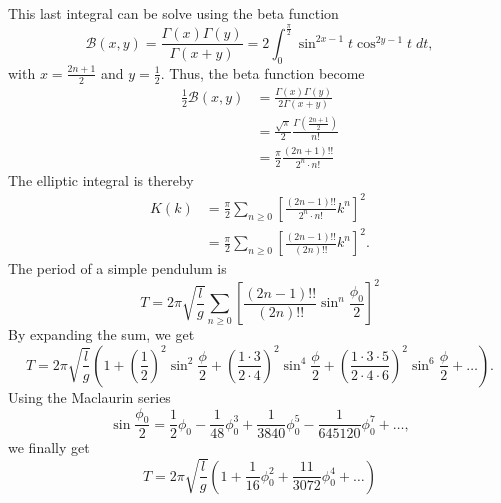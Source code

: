 \begin{problem}
{This last integral can be solve using the beta function
\begin{equation*}
    \mathcal{B}(x,y) = \frac{\Gamma(x)\Gamma(y)}{\Gamma(x+y)} = 2\int_0^{\frac{\pi}{2}} \sin^{2x-1}{t}\cos^{2y-1}{t}\;dt,
\end{equation*}
with $x=\frac{2n+1}{2}$ and $y=\frac{1}{2}$. Thus, the beta function become
\begin{align*}
    \frac{1}{2}\mathcal{B}(x,y) &= \frac{\Gamma(x)\Gamma(y)}{2\Gamma(x+y)} \\
    &= \frac{\sqrt{\pi}}{2}\frac{\Gamma(\frac{2n+1}{2})}{n!} \\
    &= \frac{\pi}{2}\frac{(2n+1)!!}{2^n \cdot n!}
\end{align*}
The elliptic integral is thereby
\begin{align*}
    K(k) &= \frac{\pi}{2} \sum_{n\geq0}\left[\frac{(2n-1)!!}{2^n \cdot n!}k^{n}\right]^2 \\
    &= \frac{\pi}{2} \sum_{n\geq0}\left[\frac{(2n-1)!!}{(2n)!!}k^{n}\right]^2.
\end{align*}
The period of a simple pendulum is
\begin{equation*}
    T = 2\pi\sqrt{\frac{l}{g}}\sum_{n\geq0}\left[\frac{(2n-1)!!}{(2n)!!}\sin^n{\frac{\phi_0}{2}}\right]^2
\end{equation*}
By expanding the sum, we get
\begin{equation*}
    T = 2\pi\sqrt{\frac{l}{g}}\left( 1 + \left(\frac{1}{2}\right)^2\sin^2{\frac{\phi}{2}} + \left(\frac{1\cdot3}{2\cdot4}\right)^2\sin^4{\frac{\phi}{2}} + \left(\frac{1\cdot3\cdot5}{2\cdot4\cdot6}\right)^2\sin^6{\frac{\phi}{2}} + \ldots \right).
\end{equation*}
Using the Maclaurin series
\begin{equation*}
    \sin{\frac{\phi_0}{2}} = \frac{1}{2}\phi_0 - \frac{1}{48}\phi_0^3 + \frac{1}{3840}\phi_0^5 - \frac{1}{645120}\phi_0^7 + \ldots,
\end{equation*}
we finally get
}
{
\begin{equation*}
    T = 2\pi\sqrt{\frac{l}{g}}\left( 1 + \frac{1}{16}\phi_0^2 + \frac{11}{3072}\phi_0^4 + \ldots \right)
\end{equation*}
}
\end{problem}


